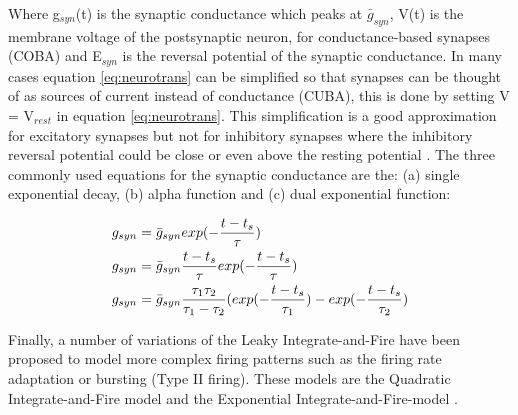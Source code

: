 Where g$_{syn}$(t) is the synaptic conductance which peaks at $\bar{g}_{syn}$, V(t) is the membrane voltage of the postsynaptic neuron, for conductance-based synapses (COBA) and E$_{syn}$ is the reversal potential of the synaptic conductance. In many cases equation \ref{eq:neurotrans} can be simplified so that synapses can be thought of as sources of current instead of conductance (CUBA), this is done by setting V = V$_{rest}$ in equation \ref{eq:neurotrans}. This simplification is a good approximation for excitatory synapses but not for inhibitory synapses where the inhibitory reversal potential could be close or even above the resting potential \cite{Schutter:2009:CMM:1822639}. The three commonly used equations for the synaptic conductance are the: (a) single exponential decay, (b) alpha function and (c) dual exponential function:


\begin{subequations}
\label{eq:synapsess}
\begin{align}
  g_{syn} &= \bar{g}_{syn} exp(-{{t-t_{s}}\over \tau})  \label{singleexp} \\
  g_{syn} &= \bar{g}_{syn} {{t-t_{s}}\over \tau } exp(-{{t-t_{s}}\over \tau})  \label{alfafunc} \\
  g_{syn} &= \bar{g}_{syn} {{\tau_{1}  \tau_{2} }\over {\tau_{1} - \tau_{2} } }   (exp(-{{t-t_{s}}\over \tau_{1} }) - exp(-{{t-t_{s}}\over \tau_{2} })  \label{dualexp}
\end{align} 
\end{subequations}

Finally, a number of variations of the Leaky Integrate-and-Fire have been proposed to model more complex firing patterns such as the firing rate adaptation or bursting (Type II firing). These models are the Quadratic Integrate-and-Fire model and the Exponential Integrate-and-Fire-model \cite{sterratt2011principles}.

